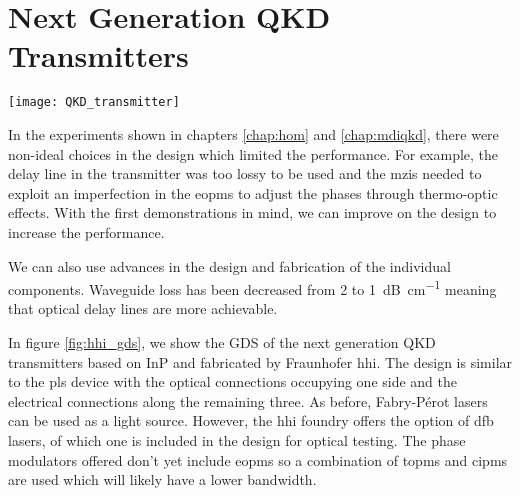 \section{Next Generation QKD Transmitters}

\begin{sidewaysfigure}
	\centering
	\texttt{[image: QKD\_transmitter]}
	\caption[Layout of latest generation InP QKD Transmitter]{Latest generation \ac{InP} transmitter fabricated by Fraunhofer \acs{hhi}. The \SI{6x4}{mm} chip contains three ways to create BB84 states for \acs{QKD}. The optical components are shown in blue, while the electrical connects are in red. Light created with on-chip lasers and manipulated with \acsp{cipm} and \acs{topm}. States are coupled off the chip through \acsp{ssc} into fibre.}
	\label{fig:hhi_gds}
\end{sidewaysfigure}

In the experiments shown in chapters \ref{chap:hom} and \ref{chap:mdiqkd}, there were non-ideal choices in the design which limited the performance. For example, the delay line in the transmitter was too lossy to be used and the \acp{mzi} needed to exploit an imperfection in the \acp{eopm} to adjust the phases through thermo-optic effects. With the first demonstrations in mind, we can improve on the design to increase the performance.

We can also use advances in the design and fabrication of the individual components. Waveguide loss has been decreased from \num{2} to \SI{1}{dB\per\cm} meaning that optical delay lines are more achievable. 



In figure \ref{fig:hhi_gds}, we show the GDS of the next generation \ac{QKD} transmitters based on \ac{InP} and fabricated by Fraunhofer \ac{hhi}. The design is similar to the \ac{pls} device with the optical connections occupying one side and the electrical connections along the remaining three. As before, Fabry-P\'{e}rot lasers can be used as a light source. However, the \ac{hhi} foundry offers the option of \ac{dfb} lasers, of which one is included in the design for optical testing. The phase modulators offered don't yet include \acp{eopm} so a combination of \acp{topm} and \acp{cipm} are used which will likely have a lower bandwidth.

